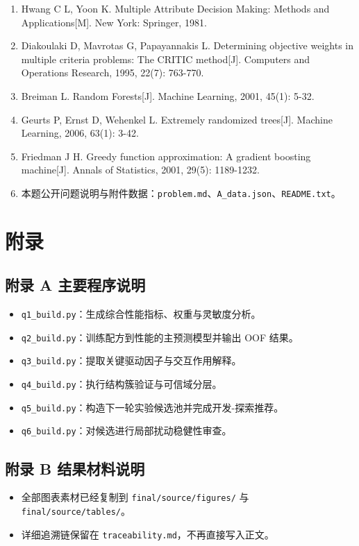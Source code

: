 \documentclass[bwprint]{gmcmthesis}
\numberwithin{figure}{section}
\begin{document}
\begin{enumerate}
\item Hwang C L, Yoon K. Multiple Attribute Decision Making: Methods and Applications[M]. New York: Springer, 1981.
\item Diakoulaki D, Mavrotas G, Papayannakis L. Determining objective weights in multiple criteria problems: The CRITIC method[J]. Computers and Operations Research, 1995, 22(7): 763-770.
\item Breiman L. Random Forests[J]. Machine Learning, 2001, 45(1): 5-32.
\item Geurts P, Ernst D, Wehenkel L. Extremely randomized trees[J]. Machine Learning, 2006, 63(1): 3-42.
\item Friedman J H. Greedy function approximation: A gradient boosting machine[J]. Annals of Statistics, 2001, 29(5): 1189-1232.
\item 本题公开问题说明与附件数据：\texttt{problem.md}、\texttt{A\_data.json}、\texttt{README.txt}。
\end{enumerate}

\section{附录}

\subsection{附录 A 主要程序说明}

\begin{itemize}
\item \texttt{q1\_build.py}：生成综合性能指标、权重与灵敏度分析。
\item \texttt{q2\_build.py}：训练配方到性能的主预测模型并输出 OOF 结果。
\item \texttt{q3\_build.py}：提取关键驱动因子与交互作用解释。
\item \texttt{q4\_build.py}：执行结构簇验证与可信域分层。
\item \texttt{q5\_build.py}：构造下一轮实验候选池并完成开发-探索推荐。
\item \texttt{q6\_build.py}：对候选进行局部扰动稳健性审查。
\end{itemize}

\subsection{附录 B 结果材料说明}

\begin{itemize}
\item 全部图表素材已经复制到 \texttt{final/source/figures/} 与 \texttt{final/source/tables/}。
\item 详细追溯链保留在 \texttt{traceability.md}，不再直接写入正文。
\end{itemize}
\end{document}
